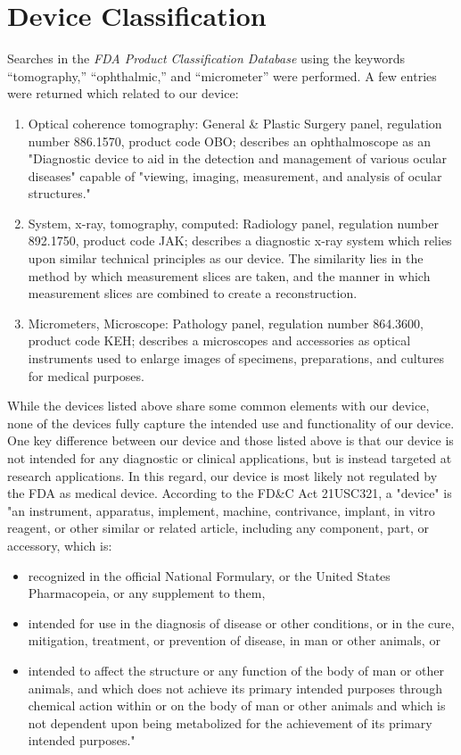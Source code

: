 \documentclass{article}
\begin{document}
\section{Device Classification}
\label{sec:protocols}

Searches in the \textit{FDA Product Classification Database} using the
keywords ``tomography,'' ``ophthalmic,'' and ``micrometer'' were
performed. A few entries were returned which related to our device:

\begin{enumerate}
\item Optical coherence tomography: General \& Plastic Surgery panel,
  regulation number 886.1570, product code OBO; describes an
  ophthalmoscope as an "Diagnostic device to aid in the detection and
  management of various ocular diseases" capable of "viewing, imaging,
  measurement, and analysis of ocular structures."
\item System, x-ray, tomography, computed: Radiology panel, regulation
  number 892.1750, product code JAK; describes a diagnostic x-ray
  system which relies upon similar technical principles as our
  device. The similarity lies in the method by which measurement
  slices are taken, and the manner in which measurement slices are
  combined to create a reconstruction.
\item Micrometers, Microscope: Pathology panel, regulation number
  864.3600, product code KEH; describes a microscopes and accessories
  as optical instruments used to enlarge images of specimens,
  preparations, and cultures for medical purposes.
\end{enumerate}

While the devices listed above share some common elements with our
device, none of the devices fully capture the intended use and
functionality of our device. One key difference between our device and
those listed above is that our device is not intended for any
diagnostic or clinical applications, but is instead targeted at
research applications. In this regard, our device is most likely not
regulated by the FDA as medical device. According to the FD\&C Act
21USC321, a "device" is "an instrument, apparatus, implement, machine,
contrivance, implant, in vitro reagent, or other similar or related
article, including any component, part, or accessory, which is:

\begin{itemize}
\item recognized in the official National Formulary, or the United
  States Pharmacopeia, or any supplement to them,
\item intended for use in the diagnosis of disease or other
  conditions, or in the cure, mitigation, treatment, or prevention of
  disease, in man or other animals, or
\item intended to affect the structure or any function of the body of
  man or other animals, and which does not achieve its primary
  intended purposes through chemical action within or on the body of
  man or other animals and which is not dependent upon being
  metabolized for the achievement of its primary intended purposes."
\end{itemize}
\end{document}
